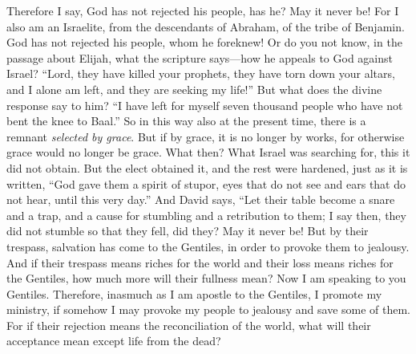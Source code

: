 \begin{biblechapter} %
 Therefore I say, God has not rejected his people, has he? May it never be! For I also am an Israelite, from the descendants of Abraham, of the tribe of Benjamin.
\verse God has not rejected his people, whom he foreknew! Or do you not know, in the passage about Elijah, what the scripture says—how he appeals to God against Israel?
\verse “Lord, they have killed your prophets, they have torn down your altars, and I alone am left, and they are seeking my life!”
\verse But what does the divine response say to him? “I have left for myself seven thousand people who have not bent the knee to Baal.”
\verse So in this way also at the present time, there is a remnant \textit{selected by grace}.
\verse But if by grace, it is no longer by works, for otherwise grace would no longer be grace.
\verse What then? What Israel was searching for, this it did not obtain. But the elect obtained it, and the rest were hardened,
\verse just as it is written, “God gave them a spirit of stupor, 
eyes that do not see and ears that do not hear, 
until this very day.”
\verse And David says,
\verse “Let their table become a snare and a trap, 
and a cause for stumbling and a retribution to them;
\verse I say then, they did not stumble so that they fell, did they? May it never be! But by their trespass, salvation has come to the Gentiles, in order to provoke them to jealousy.
\verse And if their trespass means riches for the world and their loss means riches for the Gentiles, how much more will their fullness mean?
 Now I am speaking to you Gentiles. Therefore, inasmuch as I am apostle to the Gentiles, I promote my ministry,
\verse if somehow I may provoke my people to jealousy and save some of them.
\verse For if their rejection means the reconciliation of the world, what will their acceptance mean except life from the dead?

\end{biblechapter}
